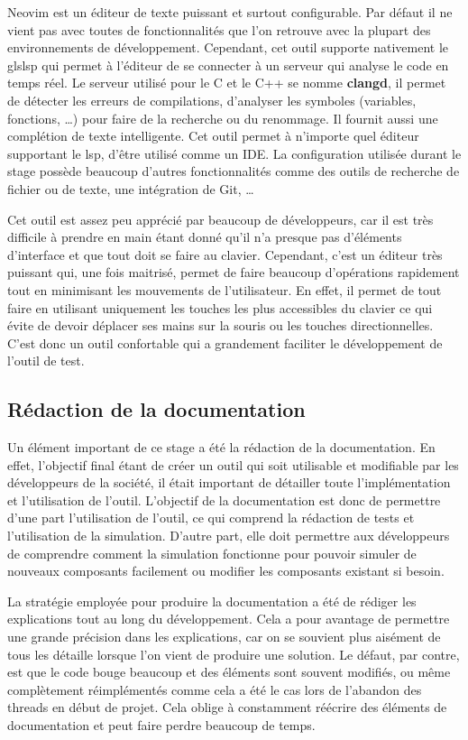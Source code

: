 \documentclass[a4paper]{article}
\begin{document}
Neovim est un éditeur de texte puissant et surtout configurable. Par défaut il
ne vient pas avec toutes de fonctionnalités que l'on retrouve avec la plupart
des environnements de développement. Cependant, cet outil supporte nativement le
gls{lsp} qui permet à l'éditeur de se connecter à un serveur qui analyse le code
en temps réel. Le serveur utilisé pour le C et le C++ se nomme \textbf{clangd},
il permet de détecter les erreurs de compilations, d'analyser les symboles
(variables, fonctions, \dots) pour faire de la recherche ou du renommage. Il
fournit aussi une complétion de texte intelligente. Cet outil permet à n'importe
quel éditeur supportant le \gls{lsp}, d'être utilisé comme un IDE. La
configuration utilisée durant le stage possède beaucoup d'autres fonctionnalités
comme des outils de recherche de fichier ou de texte, une intégration de Git,
\dots

Cet outil est assez peu apprécié par beaucoup de développeurs, car il est très
difficile à prendre en main étant donné qu'il n'a presque pas d'éléments
d'interface et que tout doit se faire au clavier. Cependant, c'est un éditeur
très puissant qui, une fois maitrisé, permet de faire beaucoup d'opérations
rapidement tout en minimisant les mouvements de l'utilisateur. En effet, il
permet de tout faire en utilisant uniquement les touches les plus accessibles du
clavier ce qui évite de devoir déplacer ses mains sur la souris ou les touches
directionnelles. C'est donc un outil confortable qui a grandement faciliter le
développement de l'outil de test.
\subsection{Rédaction de la documentation}%

Un élément important de ce stage a été la rédaction de la documentation. En
effet, l'objectif final étant de créer un outil qui soit utilisable et
modifiable par les développeurs de la société, il était important de détailler
toute l'implémentation et l'utilisation de l'outil. L'objectif de la
documentation est donc de permettre d'une part l'utilisation de l'outil, ce qui
comprend la rédaction de tests et l'utilisation de la simulation. D'autre part,
elle doit permettre aux développeurs de comprendre comment la simulation
fonctionne pour pouvoir simuler de nouveaux composants facilement ou modifier
les composants existant si besoin.

La stratégie employée pour produire la documentation a été de rédiger les
explications tout au long du développement. Cela a pour avantage de permettre
une grande précision dans les explications, car on se souvient plus aisément de
tous les détaille lorsque l'on vient de produire une solution. Le défaut, par
contre, est que le code bouge beaucoup et des éléments sont souvent modifiés,
ou même complètement réimplémentés comme cela a été le cas lors de l'abandon
des threads en début de projet. Cela oblige à constamment réécrire des éléments
de documentation et peut faire perdre beaucoup de temps.
\end{document}
